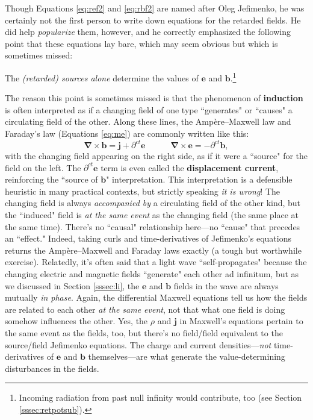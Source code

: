 \documentclass[12pt]{article}
\renewcommand{\vv}[1]{\mathbf{#1}}
\newcommand{\del}{\boldsymbol{\nabla}}
\begin{document}
Though Equations \ref{eq:ref2} and \ref{eq:rbf2} are named after Oleg Jefimenko, he was certainly not the first person to write down equations for the retarded fields. He did help \emph{popularize} them, however, and he correctly emphasized the following point that these equations lay bare, which may seem obvious but which is sometimes missed:

The \emph{(retarded) sources alone} determine the values of $\vv e$ and $\vv b$.\footnote{Incoming radiation from past null infinity would contribute, too (see Section \ref{sssec:retpotsub}).}

The reason this point is sometimes missed is that the phenomenon of \textbf{induction} is often interpreted as if a changing field of one type ``generates" or ``causes" a circulating field of the other. Along these lines, the Amp\`ere--Maxwell law and Faraday's law (Equations \ref{eq:me}) are commonly written like this:
\begin{equation*}
\del \times \vv b = \vv j + \partial^{ct} \vv e  \qquad \quad \del \times \vv e  = - \partial^{ct} \vv b ,
\end{equation*}
with the changing field appearing on the right side, as if it were a ``source" for the field on the left. The $\partial^{ct} \vv e$ term is even called the \textbf{displacement current}, reinforcing the ``source of $\vv b$" interpretation. This interpretation is a defensible heuristic in many practical contexts, but strictly speaking \emph{it is wrong}! The changing field is always \emph{accompanied by} a circulating field of the other kind, but the ``induced" field is \emph{at the same event} as the changing field (the same place at the same time). There's no ``causal" relationship here---no ``cause" that precedes an ``effect." Indeed, taking curls and time-derivatives of Jefimenko's equations returns the Amp\`ere--Maxwell and Faraday laws exactly (a tough but worthwhile exercise). Relatedly, it's often said that a light wave ``self-propagates" because the changing electric and magnetic fields ``generate" each other ad infinitum, but as we discussed in Section \ref{sssec:li}, the $\vv e$ and $\vv b$ fields in the wave are always mutually \emph{in phase}. Again, the differential Maxwell equations tell us how the fields are related to each other \emph{at the same event}, not that what one field is doing somehow influences the other. Yes, the $\rho$ and $\vv j$ in Maxwell's equations pertain to the same event as the fields, too, but there's no field/field equivalent to the source/field Jefimenko equations. The charge and current densities---\emph{not} time-derivatives of $\vv e$ and $\vv b$ themselves---are what generate the value-determining disturbances in the fields.
\end{document}
